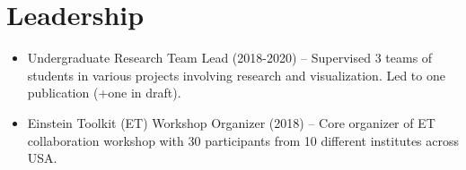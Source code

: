 \documentclass[11pt,a4paper,sans]{moderncv}       %
\begin{document}

\section{Leadership}
\vspace{1pt}
\small{
\begin{itemize}
\item{	Undergraduate Research Team Lead  (2018-2020) – Supervised 3 teams of students in various projects involving research and visualization. Led to one publication (+one in draft).  }
\vspace{4pt}
\item{	Einstein Toolkit (ET) Workshop Organizer (2018) – Core organizer of ET collaboration workshop with 30 participants from 10 different institutes across USA.  }
\end{itemize}
}
\vspace{1pt}


\end{document}
